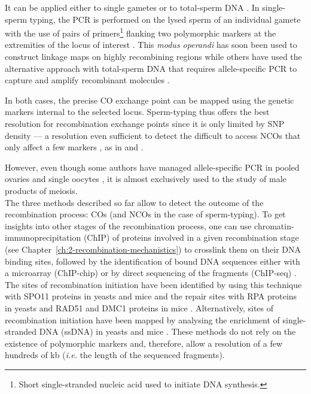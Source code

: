 It can be applied either to single gametes or to total-sperm DNA \citep[reviewed in][]{arnheim2003hot}.
In single-sperm typing, the PCR is performed on the lysed sperm of an individual gamete with the use of pairs of primers\footnote{Short single-stranded nucleic acid used to initiate DNA synthesis.} flanking two polymorphic markers at the extremities of the locus of interest \citep{cui1989singlesperm,lien1993simple}.
This \textit{modus operandi} has soon been used to construct linkage maps on highly recombining regions \citep{schmitt1994multipoint,lien2000evidence,cullen2002highresolution} while others \citep{tusie-luna1995gene, jeffreys1998highresolution, jeffreys2001intensely, guillon2002initiation} have used the alternative approach with total-sperm DNA that requires allele-specific PCR to capture and amplify recombinant molecules \citep{wu1989allelespecific}.

In both cases, the precise CO exchange point can be mapped using the genetic markers internal to the selected locus.
Sperm-typing thus offers the best resolution for recombination exchange points since it is only limited by SNP density — a resolution even sufficient to detect the difficult to access NCOs that only affect a few markers \citep{hellenthal2006insights}, as in \citet{tusie-luna1995gene} and \citet{guillon2002initiation}.

However, even though some authors have managed allele-specific PCR in pooled ovaries \citep{guillon2005crossover, baudat2007cis} and single oocytes \citep{cole2014mouse}, it is almost exclusively used to the study of male products of meiosis.\\

The three methods described so far allow to detect the outcome of the recombination process: COs (and NCOs in the case of sperm-typing).
To get insights into other stages of the recombination process, one can use chromatin-immunoprecipitation (ChIP) of proteins involved in a given recombination stage (see Chapter~\ref{ch:2-recombination-mechanistics}) to crosslink them on their DNA binding sites, followed by the identification of bound DNA sequences either with a microarray (ChIP-chip) or by direct sequencing of the fragments (ChIP-seq) \citep[reviewed in][]{park2009chipseq}. 
The sites of recombination initiation have been identified by using this technique with SPO11 proteins in yeasts \citep{gerton2000global,mieczkowski2007loss,pan2011hierarchical} and mice \citep{lange2016landscape} and the repair sites with RPA proteins in yeasts \citep{borde2009histone} and RAD51 and DMC1 proteins in mice \citep{smagulova2011genomewide,brick2012genetic}.
Alternatively, sites of recombination initiation have been mapped by analysing the enrichment of single-stranded DNA (ssDNA) in yeasts \citep{blitzblau2007mapping,buhler2007mapping} and mice \citep{khil2012sensitive}.
These methods do not rely on the existence of polymorphic markers and, therefore, allow a resolution of a few hundreds of kb (\textit{i.e.} the length of the sequenced fragments).\\



